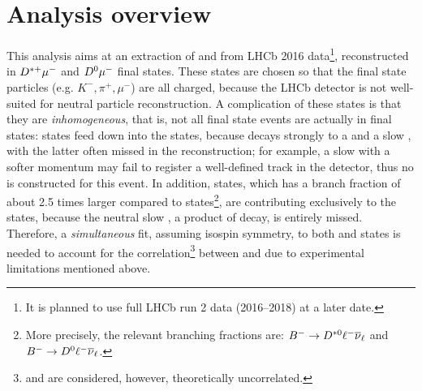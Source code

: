 \chapter{Analysis overview}
\label{ref:overview}

This analysis aims at an extraction of \RD and \RDst from
LHCb 2016 data\footnote{
    It is planned to use full LHCb run 2 data (2016--2018) at a later date.
}, reconstructed in ${{D}^{*+}}{\mu^-}$ and ${{D}^0}{\mu^-}$ final states.
These states are chosen so that the final state particles
(e.g. $K^-, \pi^+, \mu^-$) are all charged, because the LHCb detector is not
well-suited for neutral particle reconstruction.
A complication of these states is that they are \emph{inhomogeneous},
that is, not all \Dz\mun final state events are actually in \Dz\mun final
states:
\Dstarp\mun states feed down into the \Dz\mun states,
because \Dstarp decays strongly to a \Dz and a slow \pip,
with the latter often missed in the reconstruction;
for example, a slow \pip with a softer momentum may fail to register a
well-defined track in the detector, thus no \Dstarp is constructed for this
event.
In addition, \Dstarz\mun states,
which has a branch fraction of about 2.5 times larger compared to \Dz\mun
states\footnote{
    More precisely, the relevant branching fractions are:
    ${{{B}^-}} \rightarrow {\ensuremath{{D}^{*0}}} \ell^- {{\overline{\nu}}_\ell}$ and
    ${{{B}^-}} \rightarrow {\ensuremath{{D}^0}} \ell^- {{\overline{\nu}}_\ell}$.
},
are contributing exclusively to the \Dz\mun states, because the neutral slow
\piz, a product of \Dstarz decay, is entirely missed.
Therefore, a \emph{simultaneous} fit,
assuming isospin symmetry,
to both \Dstarp\mun and \Dz\mun states is needed to
account for the correlation\footnote{
    \RD and \RDst are considered, however, theoretically uncorrelated.
} between \RD and \RDst due to experimental limitations mentioned above.


